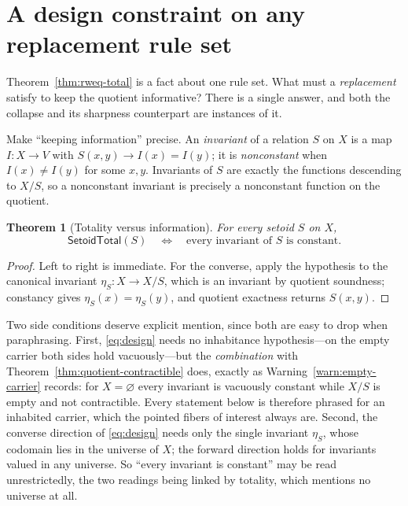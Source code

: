 \documentclass[10pt,reqno]{amsart}
\newtheorem{theorem}{Theorem}[section]
\newcommand{\SetTot}{\mathsf{SetoidTotal}}
\begin{document}
\section{A design constraint on any replacement rule set}
\label{sec:design}

Theorem~\ref{thm:rweq-total} is a fact about one rule set.  What must a
\emph{replacement} satisfy to keep the quotient informative?  There is a single
answer, and both the collapse and its sharpness counterpart are instances of it.

Make ``keeping information'' precise.  An \emph{invariant} of a relation \(S\)
on \(X\) is a map \(I:X\to V\) with \(S(x,y)\to I(x)=I(y)\); it is
\emph{nonconstant} when \(I(x)\ne I(y)\) for some \(x,y\).  Invariants of \(S\)
are exactly the functions descending to \(X/S\), so a nonconstant invariant is
precisely a nonconstant function on the quotient.

\begin{theorem}[Totality versus information]
\label{thm:design}
For every setoid \(S\) on \(X\),
\[
 \SetTot(S)
 \quad\Longleftrightarrow\quad
 \text{every invariant of \(S\) is constant.}
\tag{12.1}\label{eq:design}
\]
\end{theorem}

\begin{proof}
Left to right is immediate.  For the converse, apply the hypothesis to the
canonical invariant \(\eta_S:X\to X/S\), which is an invariant by quotient
soundness; constancy gives \(\eta_S(x)=\eta_S(y)\), and quotient exactness
returns \(S(x,y)\).
\end{proof}

Two side conditions deserve explicit mention, since both are easy to drop when
paraphrasing.  First, \eqref{eq:design} needs no inhabitance hypothesis---on the
empty carrier both sides hold vacuously---but the \emph{combination} with
Theorem~\ref{thm:quotient-contractible} does, exactly as
Warning~\ref{warn:empty-carrier} records: for \(X=\varnothing\) every invariant
is vacuously constant while \(X/S\) is empty and not contractible.  Every
statement below is therefore phrased for an inhabited carrier, which the pointed
fibers of interest always are.  Second, the converse direction of
\eqref{eq:design} needs only the single invariant \(\eta_S\), whose codomain
lies in the universe of \(X\); the forward direction holds for invariants valued
in any universe.  So ``every invariant is constant'' may be read unrestrictedly,
the two readings being linked by totality, which mentions no universe at all.
\end{document}
